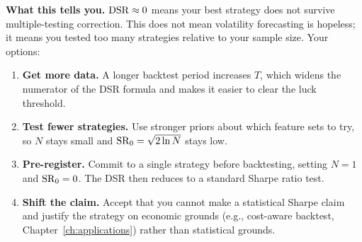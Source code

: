 \begin{workedexample}
\textbf{What this tells you.}
$\operatorname{DSR} \approx 0$ means your best strategy does not survive multiple-testing correction.
This does not mean volatility forecasting is hopeless; it means you tested too many strategies relative to your sample size.
Your options:
\begin{enumerate}[nosep]
  \item \textbf{Get more data.} A longer backtest period increases $T$, which widens the numerator of the DSR formula and makes it easier to clear the luck threshold.
  \item \textbf{Test fewer strategies.} Use stronger priors about which feature sets to try, so $N$ stays small and $\operatorname{SR}_0 = \sqrt{2 \ln N}$ stays low.
  \item \textbf{Pre-register.} Commit to a single strategy before backtesting, setting $N = 1$ and $\operatorname{SR}_0 = 0$. The DSR then reduces to a standard Sharpe ratio test.
  \item \textbf{Shift the claim.} Accept that you cannot make a statistical Sharpe claim and justify the strategy on economic grounds (e.g., cost-aware backtest, Chapter~\ref{ch:applications}) rather than statistical grounds.
\end{enumerate}
\end{workedexample}

